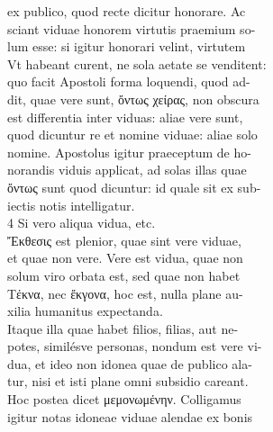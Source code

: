 \documentclass{article}
\begin{document}
\begin{pages}
                ex publico, quod recte dicitur honorare. Ac \\
                sciant viduae honorem virtutis praemium so- \\
                lum esse: si igitur honorari velint, virtutem \\
                Vt habeant curent, ne sola aetate se venditent: \\
                quo facit Apostoli forma loquendi, quod ad- \\
                dit, quae vere sunt, ὄντως χείρας, non obscura \\
                est differentia inter viduas: aliae vere sunt, \\
                quod dicuntur re et nomine viduae: aliae solo \\
                nomine. Apostolus igitur praeceptum de ho- \\
                norandis viduis applicat, ad solas illas quae \\
                ὄντως sunt quod dicuntur: id quale sit ex sub- \\
                iectis notis intelligatur. \\
                4 Si vero aliqua vidua, etc. \\
                Ἔκθεσις est plenior, quae sint vere viduae, \\
                et quae non vere. Vere est vidua, quae non \\
                solum viro orbata est, sed quae non habet \\
                Τέκνα, nec ἔκγονα, hoc est, nulla plane au- \\
                xilia humanitus expectanda. \\
                Itaque illa quae habet filios, filias, aut ne- \\
                potes, similésve personas, nondum est vere vi- \\
                dua, et ideo non idonea quae de publico ala- \\
                tur, nisi et isti plane omni subsidio careant. \\
                Hoc postea dicet μεμονωμένην. Colligamus \\
                igitur notas idoneae viduae alendae ex bonis \\

\end{pages}
\end{document}
